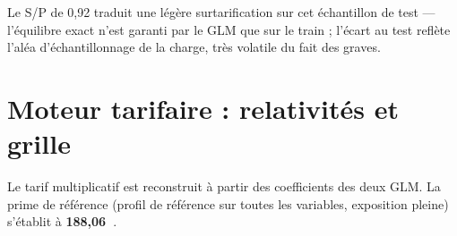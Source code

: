 \documentclass[11pt,a4paper]{article}
\newcommand{\eur}{\texteuro}
\begin{document}
Le S/P de 0{,}92 traduit une légère surtarification sur cet échantillon de test --- l'équilibre exact n'est garanti par le GLM que sur le train ; l'écart au test reflète l'aléa d'échantillonnage de la charge, très volatile du fait des graves.

\section{Moteur tarifaire : relativités et grille}

Le tarif multiplicatif est reconstruit à partir des coefficients des deux GLM. La prime de référence (profil de référence sur toutes les variables, exposition pleine) s'établit à \textbf{188{,}06~\eur}.
\end{document}
